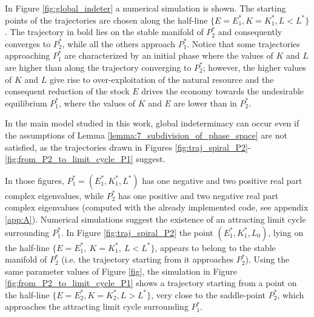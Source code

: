 In Figure \ref{fig:global_indeter} a numerical simulation is shown. The starting points of the trajectories are chosen along the half-line $\{E=E_1^*, K=K_1^*, L<L^*\}$. The trajectory in bold lies on the stable manifold of $P_2^*$ and consequently converges to $P_2^*$, while all the others approach $P_1^*$. Notice that some trajectories approaching $P_1^*$ are characterized by an initial phase where the values of $K$ and $L$ are higher than along the trajectory converging to $P_2^*$; however, the higher values of $K$ and $L$ give rise to over-exploitation of the natural resource and the consequent reduction of the stock $E$ drives the economy towards the undesirable equilibrium $P_1^*$, where the values of $K$ and $E$ are lower than in $P_2^*$.


In the main model studied in this work, global indeterminacy can occur even if the assumptions of Lemma \ref{lemma:7_subdivision_of_phase_space} are not satisfied, as the trajectories drawn in Figures \ref{fig:traj_spiral_P2}-\ref{fig:from_P2_to_limit_cycle_P1} suggest.

In those figures, $P_1^*=(E_1^*,K_1^*,L^*)$ has one negative and two positive real part complex eigenvalues, while $P_2^*$ has one positive and two negative real part complex eigenvalues (computed with the already implemented code, see appendix \ref{app:A}). Numerical simulations suggest the existence of an attracting limit cycle surrounding $P_1^*$. In Figure \ref{fig:traj_spiral_P2} the
point $(E_1^*,K_1^*,L_0)$, lying on the half-line $\{E = E_1^*,\ K = K_1^*,\ L < L^*\}$, appears to belong to the stable manifold of $P_2^*$ (i.e. the trajectory starting from it approaches $P_2^*$). Using the same parameter values of Figure \ref{fig}, the simulation in Figure \ref{fig:from_P2_to_limit_cycle_P1} shows a trajectory starting from a point on the half-line $\{E = E_2^*, K = K_2^*, L > L^*\}$, very close to the saddle-point $P_2^*$, which approaches
the attracting limit cycle surrounding $P_1^*$.